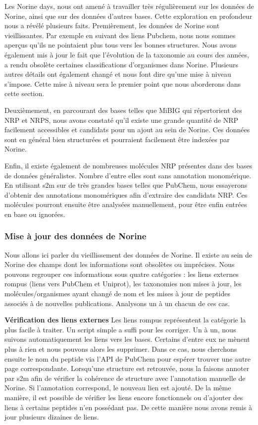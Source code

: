 Les Norine days, nous ont amené à travailler très régulièrement sur les données de Norine, ainsi que sur des données d'autres bases.
Cette exploration en profondeur nous a révélé plusieurs faits.
Premièrement, les données de Norine sont vieillissantes.
Par exemple en suivant des liens Pubchem, nous nous sommes aperçus qu'ils ne pointaient plus tous vers les bonnes structures.
Nous avons également mis à jour le fait que l'évolution de la taxonomie au cours des années, a rendu obsolète certaines classifications d'organismes dans Norine.
Plusieurs autres détails ont également changé et nous font dire qu'une mise à niveau s'impose.
Cette mise à niveau sera le premier point que nous aborderons dans cette section.

Deuxièmement, en parcourant des bases telles que MiBIG qui répertorient des NRP et NRPS, nous avons constaté qu'il existe une grande quantité de NRP facilement accessibles et candidats pour un ajout au sein de Norine.
Ces données sont en général bien structurées et pourraient facilement être indexées par Norine.

Enfin, il existe également de nombreuses molécules NRP présentes dans des bases de données généralistes.
Nombre d'entre elles sont sans annotation monomérique.
En utilisant s2m sur de très grandes bases telles que PubChem, nous essayerons d'obtenir des annotations monomériques afin d'extraire des candidats NRP.
Ces molécules pourront ensuite être analysées manuellement, pour être enfin entrées en base ou ignorées.


\subsubsection{Mise à jour des données de Norine}

Nous allons ici parler du vieillissement des données de Norine.
Il existe au sein de Norine des champs dont les informations sont obsolètes ou imprécises.
Nous pouvons regrouper ces informations sous quatre catégories : les liens externes rompus (liens vers PubChem et Uniprot), les taxonomies non mises à jour, les molécules/organismes ayant changé de nom et les mises à jour de peptides associés à de nouvelles publications.
Analysons un à un chacun de ces cas.


\textbf{Vérification des liens externes}
Les liens rompus représentent la catégorie la plus facile à traiter.
Un script simple a suffi pour les corriger.
Un à un, nous suivons automatiquement les liens vers les bases.
Certains d'entre eux ne mènent plus à rien et nous pouvons alors les supprimer.
Dans ce cas, nous cherchons ensuite le nom du peptide via l'API de PubChem pour espérer trouver une autre page correspondante.
Lorsqu'une structure est retrouvée, nous la faisons annoter par s2m afin de vérifier la cohérence de structure avec l'annotation manuelle de Norine.
Si l'annotation correspond, le nouveau lien est ajouté.
De la même manière, il est possible de vérifier les liens encore fonctionnels ou d'ajouter des liens à certains peptides n'en possédant pas.
De cette manière nous avons remis à jour plusieurs dizaines de liens.



